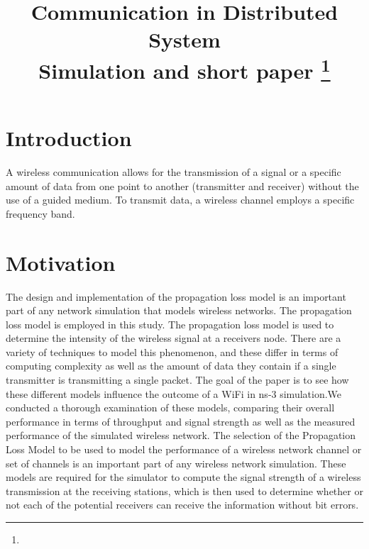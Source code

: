 \documentclass[conference]{IEEEtran}
\begin{document}
\title{Communication in Distributed System \\
{\footnotesize  Simulation and short paper}
\thanks{}
}

\author{

}

\maketitle


\section{Introduction}
A wireless communication allows for the transmission of a signal or a specific amount of data from one point to another (transmitter and receiver) without the use of a guided medium. To transmit data, a wireless channel employs a specific frequency band.

\section{Motivation}
The design and implementation of the propagation loss model is an important part of any network simulation that models wireless networks. The propagation loss model is employed in this study.
The propagation loss model is used to determine the intensity of the wireless signal at a receivers node. There are a variety of techniques to model this phenomenon, and these differ in terms of computing complexity as well as the amount of data they contain if a single transmitter is transmitting a single packet.
The goal of the paper is to see how these different models influence the outcome of a WiFi in ns-3 simulation.We conducted a thorough examination of these models, comparing their overall performance in terms of throughput and signal strength as well as the measured performance of the simulated wireless network.
The selection of the Propagation Loss Model to be used to model the performance of a wireless network channel or set of channels is an important part of any wireless network simulation. These models are required for the simulator to compute the signal strength of a wireless transmission at the receiving stations, which is then used to determine whether or not each of the potential receivers can receive the information without bit errors.
\end{document}
